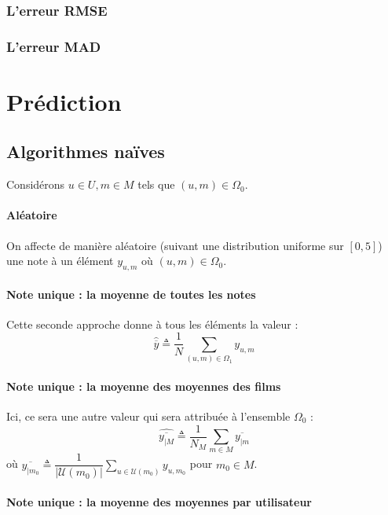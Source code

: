 \documentclass[a4paper, 11pt]{book}
\begin{document}
\subsection{L'erreur RMSE}

\subsection{L'erreur MAD}

\chapter{Prédiction}

\section{Algorithmes naïves}

Considérons $u \in U, m \in M$ tels que $(u,m) \in \Omega_0$.

\subsubsection{Aléatoire}

On affecte de manière aléatoire (suivant une distribution uniforme sur $[0,5]$) une note à un élément $y_{u,m}$ où $(u,m) \in \Omega_0$.

\subsubsection{Note unique : la moyenne de toutes les notes}

Cette seconde approche donne à tous les éléments la valeur : 
$$\hat{\overline{y}} \triangleq \displaystyle \dfrac{1}{N} \sum \limits_{(u,m) \in \Omega_1} y_{u,m}$$

\subsubsection{Note unique : la moyenne des moyennes des films}

Ici, ce sera une autre valeur qui sera attribuée à l'ensemble $\Omega_0$ : 
$$\hat{\overline{y_{|M}}}  \triangleq \displaystyle \dfrac{1}{N_M} \sum \limits_{m \in M} \overline{y_{|m}}$$
où  $\overline{y_{|m_0}} \triangleq \displaystyle \dfrac{1}{|\mathcal{U}(m_0)|} \sum \limits_{u \in \mathcal{U}(m_0) } y_{u,m_0}$ pour $m_0 \in M$.

\subsubsection{Note unique : la moyenne des moyennes par utilisateur}
\end{document}
